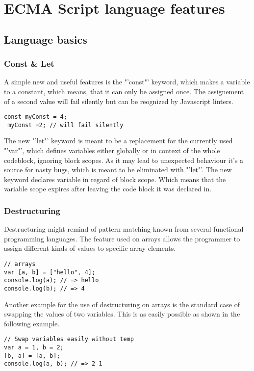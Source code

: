 \documentclass{bioinfo}
\begin{document}
\section{ECMA Script language features}

\subsection{Language basics}

\subsubsection{Const \& Let}
A simple new and useful features is the "'const"' keyword, which makes a variable to a constant, which means, 
that it can only be assigned once. The assignement of a second value will fail silently but can be reognized by
Javascript linters.
\begin{lstlisting}[caption= My Javascript Example]
const myConst = 4;
 myConst =2; // will fail silently
\end{lstlisting}

The new "'let"' keyword is meant to be a replacement for the currently used "'var"', which defines variables 
either globally or in context of the whole codeblock, ignoring block scopes. As it may lead to unexpected behaviour
it's a source for nasty bugs, which is meant to be eliminated with "'let"'. The new keyword declares variable in 
regard of block scope. Which means that the variable scope expires after leaving the code block it was declared in.


\subsubsection{Destructuring}
Destructuring might remind of pattern matching known from several functional programming languages.
The feature used on arrays allows the programmer to assign different kinds of values to specific array elements.
\begin{lstlisting}[caption= My Javascript Example]
// arrays
var [a, b] = ["hello", 4];
console.log(a); // => hello
console.log(b); // => 4
\end{lstlisting}

Another example for the use of destructuring on arrays is the standard case of swapping the values of two variables.
This is as easily possible as shown in the following example.
\begin{lstlisting}[caption= My Javascript Example]
// Swap variables easily without temp
var a = 1, b = 2;
[b, a] = [a, b];
console.log(a, b); // => 2 1
\end{lstlisting}
\end{document}
